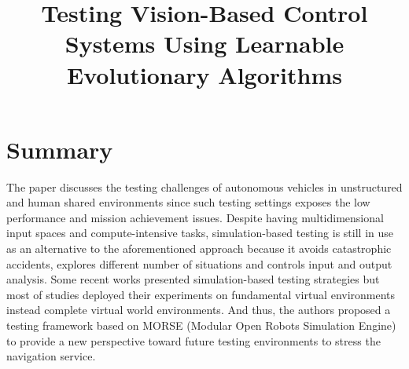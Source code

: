 \documentclass[10pt,a4paper]{report}
\title{Testing Vision-Based Control Systems Using Learnable Evolutionary Algorithms}
\begin{document}
\begin{center}
\textbf{\thetitle}
\end{center}


\section{Summary}
The paper discusses the testing challenges of autonomous vehicles in unstructured and human shared environments since such testing settings exposes the low performance and mission achievement issues. 
%
Despite having multidimensional input spaces and compute-intensive tasks, simulation-based testing is still in use as an alternative to the aforementioned approach because it avoids catastrophic accidents, explores different number of situations and controls input and output analysis.
%
Some recent works presented simulation-based testing strategies but most of studies deployed their experiments on fundamental virtual environments instead complete virtual world environments.
%
And thus, the authors proposed a testing framework based on MORSE (Modular Open Robots Simulation Engine) to provide a new perspective toward future testing environments to stress the navigation service.
%
\end{document}
